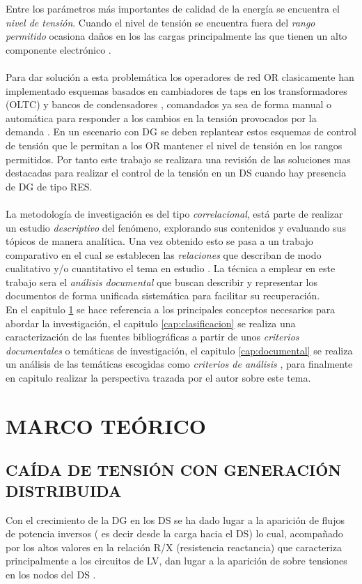 \documentclass[12pt, letterpaper]{report}
\begin{document}
Entre los parámetros más importantes de  calidad de la energía se encuentra el \textit{nivel de tensión}. Cuando el nivel de tensión se encuentra fuera del \textit{rango permitido} ocasiona daños en los las cargas principalmente las que tienen un alto componente electrónico \cite{baggini2008handbook}.\\\\
Para dar solución a esta problemática los operadores de red OR clasicamente han implementado esquemas basados en cambiadores de taps en los transformadores (\ac{OLTC})  y bancos de condensadores \cite{Acha2002a}\cite{Bisanovic2014}, comandados ya sea de forma manual o automática para responder a los cambios en la tensión provocados por la demanda \cite{Gubina2001}. En un escenario con \ac{DG} se deben replantear estos esquemas de control de tensión \cite{Yadav2014} que le permitan a los \ac{OR} mantener el nivel de tensión en los rangos permitidos. Por tanto este trabajo se realizara una revisión  de  las soluciones mas destacadas  para realizar el control de la tensión en un \ac{DS} cuando hay presencia de \ac{DG} de tipo \ac{RES}. \\\\
La metodología de investigación es del tipo \textit{correlacional}, está parte  de realizar un estudio \emph{descriptivo} del fenómeno,  explorando sus contenidos  y  evaluando  sus tópicos de manera analítica. Una vez obtenido  esto  se pasa a un trabajo comparativo  en el cual se establecen las    \textit{relaciones} que describan de modo cualitativo y/o cuantitativo  el tema en estudio . La técnica a emplear en este trabajo sera el \textit{análisis documental} que buscan describir y representar los documentos de forma unificada sistemática para facilitar su recuperación.\\
En el capitulo  \ref{cap:teorico} se hace referencia  a los principales conceptos necesarios para abordar la investigación, el capitulo \ref{cap:clasificacion} se realiza una caracterización de las  fuentes bibliográficas a partir de unos \textit{criterios documentales} o temáticas de investigación,  el capitulo \ref{cap:documental}  se realiza un análisis de las temáticas escogidas como \textit{criterios de análisis }, para finalmente en capitulo  realizar  la perspectiva trazada por el autor sobre este tema.

\chapter{MARCO TEÓRICO}
\label{cap:teorico}
\section{CAÍDA DE TENSIÓN CON GENERACIÓN DISTRIBUIDA}
Con el crecimiento de la \ac{DG} \cite{Cao2016} en los \ac{DS} se ha dado lugar a la aparición de flujos de potencia inversos ( es decir desde la carga hacia el \ac{DS}) lo cual, acompañado por los altos valores en la relación R/X (resistencia reactancia) que caracteriza principalmente a los circuitos de \ac{LV}, dan lugar a la aparición de sobre tensiones en los nodos del  \ac{DS} \cite{su2009comparative}\cite{Tang2017}.\\
\end{document}
